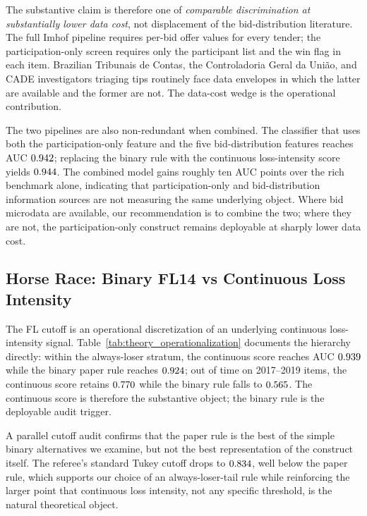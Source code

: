 The substantive claim is therefore one of \emph{comparable
discrimination at substantially lower data cost}, not
displacement of the bid-distribution literature. The full Imhof
pipeline requires per-bid offer values for every tender; the
participation-only screen requires only the participant list
and the win flag in each item. Brazilian Tribunais de Contas,
the Controladoria Geral da Uni\~ao, and CADE investigators
triaging tips routinely face data envelopes in which the latter
are available and the former are not. The data-cost wedge is
the operational contribution.

The two pipelines are also non-redundant when combined. The
classifier that uses both the participation-only feature and
the five bid-distribution features reaches AUC
$0.942$; replacing the binary rule with the
continuous loss-intensity score yields $0.944$.
The combined model gains roughly ten AUC points over the rich
benchmark alone, indicating that participation-only and
bid-distribution information sources are not measuring the same
underlying object. Where bid microdata are available, our
recommendation is to combine the two; where they are not, the
participation-only construct remains deployable at sharply lower
data cost.



\subsection{Horse Race: Binary FL14 vs Continuous Loss Intensity}

The FL cutoff is an operational discretization of an underlying
continuous loss-intensity signal. Table~\ref{tab:theory_operationalization}
documents the hierarchy directly: within the always-loser
stratum, the continuous score reaches AUC $0.939$ while
the binary paper rule reaches $0.924$; out of time on
2017--2019 items, the continuous score retains
$0.770$ while the binary rule falls to
$0.565$. The continuous score is therefore the
substantive object; the binary rule is the deployable audit
trigger.

A parallel cutoff audit confirms that the paper rule is the
best of the simple binary alternatives we examine, but not the
best representation of the construct itself. The referee's
standard Tukey cutoff drops to $0.834$, well below
the paper rule, which supports our choice of an
always-loser-tail rule while reinforcing the larger point that
continuous loss intensity, not any specific threshold, is the
natural theoretical object.

